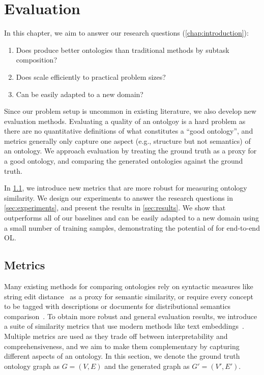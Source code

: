 \chapter{Evaluation}  \label{chap:evaluation}

In this chapter, we aim to answer our research questions (\cref{chap:introduction}):
\begin{enumerate}[leftmargin=*]
    \item Does \name produce better ontologies than traditional methods by subtask composition?
    \item Does \name scale efficiently to practical problem sizes?
    \item Can \name be easily adapted to a new domain?
\end{enumerate}
Since our problem setup is uncommon in existing literature, we also develop new evaluation methods. Evaluating a quality of an ontolgoy is a hard problem as there are no quantitative definitions of what constitutes a ``good ontology'', and metrics generally only capture one aspect (e.g., structure but not semantics) of an ontology. We approach evaluation by treating the ground truth as a proxy for a good ontology, and comparing the generated ontologies against the ground truth.

In \cref{sec:metrics}, we introduce new metrics that are more robust for measuring ontology similarity. We design our experiments to answer the research questions in \cref{sec:experiments}, and present the results in \cref{sec:results}. We show that \name outperforms all of our baselines and can be easily adapted to a new domain using a small number of training samples, demonstrating the potential of \name for end-to-end OL.

\section{Metrics}  \label{sec:metrics}

Many existing methods for comparing ontologies rely on syntactic measures like string edit distance~\cite{Ehrig2005SimilarityFO} as a proxy for semantic similarity, or require every concept to be tagged with descriptions or documents for distributional semantics comparison~\cite{Zavitsanos2011GoldSE}. To obtain more robust and general evaluation results, we introduce a suite of similarity metrics that use modern methods like text embeddings~\cite{reimers-2019-sentence-bert}. Multiple metrics are used as they trade off between interpretability and comprehensiveness, and we aim to make them complementary by capturing different aspects of an ontology. In this section, we denote the ground truth ontology graph as $G = (V, E)$ and the generated graph as $G' = (V', E')$.

